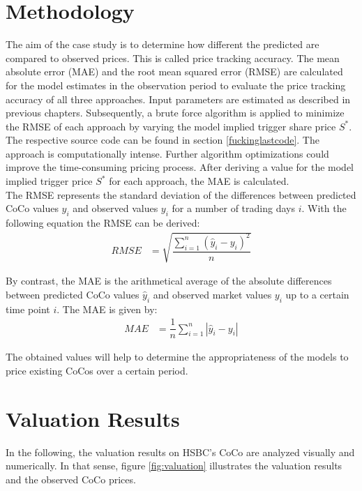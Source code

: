 \section{Methodology}

The aim of the case study is to determine how different the predicted are compared to observed prices. This is called price tracking accuracy. The mean absolute error (MAE) and the root mean squared error (RMSE) are calculated for the model estimates in the observation period to evaluate the price tracking accuracy of all three approaches. Input parameters are estimated as described in previous chapters. Subsequently, a brute force algorithm is applied to minimize the RMSE of each approach by varying the model implied trigger share price $S^*$. The respective source code can be found in section \ref{fuckinglastcode}. The approach is computationally intense. Further algorithm optimizations could improve the time-consuming pricing process. After deriving a value for the model implied trigger price $S^*$ for each approach, the MAE is calculated.\\  

The RMSE represents the standard deviation of the differences between predicted CoCo values $\hat{y}_i$ and observed values $y_i$ for a number of trading days $i$. With the following equation the RMSE can be derived:
\begin{align}
RMSE &= \sqrt{\dfrac{\sum_{i=1}^{n} \left( \hat{y}_i - y_i \right)^2}{n}}
\end{align}

By contrast, the MAE is the arithmetical average of the absolute differences between predicted CoCo values $\hat{y}_i$ and observed market values $y_i$ up to a certain time point $i$. The MAE is given by:
\begin{align}
MAE &= \dfrac{1}{n} \sum_{i=1}^{n} |\hat{y}_i - y_i | 
\end{align}

The obtained values will help to determine the appropriateness of the models to price existing CoCos over a certain period.

\section{Valuation Results}

In the following, the valuation results on HSBC's CoCo are analyzed visually and numerically. In that sense, figure \ref{fig:valuation} illustrates the valuation results and the observed CoCo prices.
 
